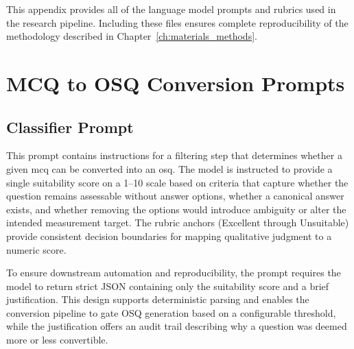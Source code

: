 \label{appendix-a}

This appendix provides all of the language model prompts and rubrics used in the research pipeline. Including these files ensures complete reproducibility of the methodology described in Chapter~\ref{ch:materials_methods}. 

\section{MCQ to OSQ Conversion Prompts}
\label{app:mcq_to_osq_prompts}


\subsection{Classifier Prompt}

This prompt contains instructions for a filtering step that determines whether a given \ac{mcq} can be converted into an \ac{osq}. The model is instructed to provide a single suitability score on a 1–10 scale based on criteria that capture whether the question remains assessable without answer options, whether a canonical answer exists, and whether removing the options would introduce ambiguity or alter the intended measurement target. The rubric anchors (Excellent through Unsuitable) provide consistent decision boundaries for mapping qualitative judgment to a numeric score.

To ensure downstream automation and reproducibility, the prompt requires the model to return strict JSON containing only the suitability score and a brief justification. This design supports deterministic parsing and enables the conversion pipeline to gate OSQ generation based on a configurable threshold, while the justification offers an audit trail describing why a question was deemed more or less convertible.

